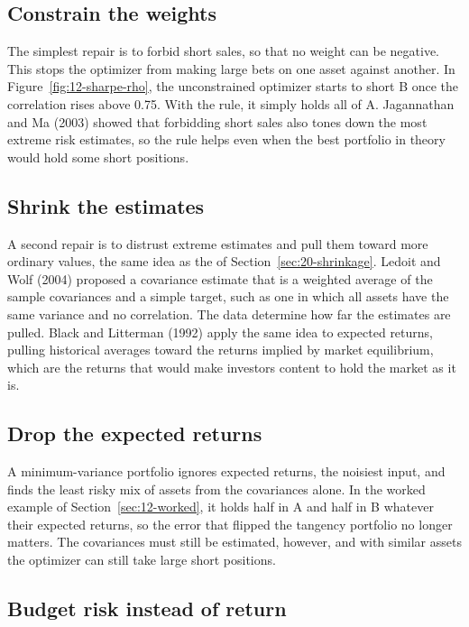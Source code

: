 \subsection{Constrain the weights}

The simplest repair is to forbid short sales, so that no weight can be negative. This stops the optimizer from making large bets on one asset against another. In Figure~\ref{fig:12-sharpe-rho}, the unconstrained optimizer starts to short B once the correlation rises above 0.75. With the rule, it simply holds all of A. Jagannathan and Ma (2003) showed that forbidding short sales also tones down the most extreme risk estimates, so the rule helps even when the best portfolio in theory would hold some short positions.

\subsection{Shrink the estimates}

A second repair is to distrust extreme estimates and pull them toward more ordinary values, the same idea as the  of Section~\ref{sec:20-shrinkage}. Ledoit and Wolf (2004) proposed a covariance estimate that is a weighted average of the sample covariances and a simple target, such as one in which all assets have the same variance and no correlation. The data determine how far the estimates are pulled. Black and Litterman (1992) apply the same idea to expected returns, pulling historical averages toward the returns implied by market equilibrium, which are the returns that would make investors content to hold the market as it is.

\subsection{Drop the expected returns}

A minimum-variance portfolio ignores expected returns, the noisiest input, and finds the least risky mix of assets from the covariances alone. In the worked example of Section~\ref{sec:12-worked}, it holds half in A and half in B whatever their expected returns, so the error that flipped the tangency portfolio no longer matters. The covariances must still be estimated, however, and with similar assets the optimizer can still take large short positions.

\subsection{Budget risk instead of return}

